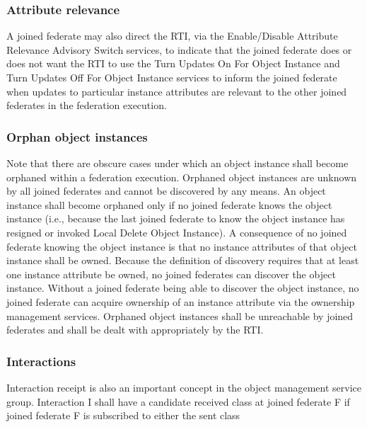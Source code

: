\begin{compactstdpage}
    \subsubsection{Attribute relevance}


    A joined federate may also direct the RTI, via the Enable/Disable Attribute Relevance Advisory Switch services, to indicate that the joined federate does or does not want the RTI to use the Turn Updates On For Object Instance \rtiinitiated{} and Turn Updates Off For Object Instance \rtiinitiated{} services to inform the joined federate when updates to particular instance attributes are relevant to the other joined federates in the federation execution.

    \subsubsection{Orphan object instances}


    Note that there are obscure cases under which an object instance shall become orphaned within a federation execution. Orphaned object instances are unknown by all joined federates and cannot be discovered by any means. An object instance shall become orphaned only if no joined federate knows the object instance (i.e., because the last joined federate to know the object instance has resigned or invoked Local Delete Object Instance). A consequence of no joined federate knowing the object instance is that no instance attributes of that object instance shall be owned. Because the definition of discovery requires that at least one instance attribute be owned, no joined federates can discover the object instance. Without a joined federate being able to discover the object instance, no joined federate can acquire ownership of an instance attribute via the ownership management services. Orphaned object instances shall be unreachable by joined federates and shall be dealt with appropriately by the RTI.

    \subsubsection{Interactions}


    Interaction receipt is also an important concept in the object management service group. Interaction I shall have a candidate received class at joined federate F if joined federate F is subscribed to either the sent class

\end{compactstdpage}

